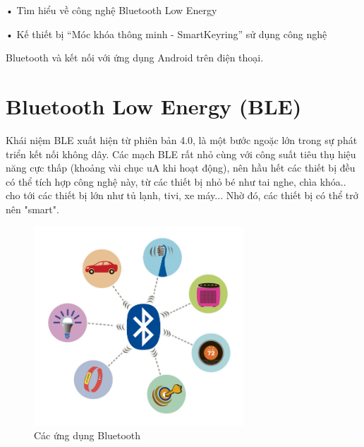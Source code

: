 • Tìm hiểu về công nghệ Bluetooth Low Energy

• Kế thiết bị “Móc khóa thông minh - SmartKeyring” sử dụng công nghệ

Bluetooth và kết nối với ứng dụng Android trên điện thoại.

\nomenclature[g-p]{$\pi$}{ $\simeq 3.14\ldots$}                                             %


\section{Bluetooth Low Energy (BLE) }  %
\label{section1.3} 
Khái niệm BLE xuất hiện từ phiên bản 4.0, là một bước ngoặc lớn trong sự phát triển kết nối không dây. Các mạch BLE rất nhỏ cùng với công suất tiêu thụ hiệu năng cực thấp (khoảng vài chục uA khi hoạt động), nên hầu hết các thiết bị đều có thể tích hợp công nghệ này, từ các thiết bị nhỏ bé như tai nghe, chìa khóa.. cho tới các thiết bị lớn như tủ lạnh, tivi, xe máy... Nhờ đó, các thiết bị có thể trở nên "smart".\cite{hte}
\begin{figure}[H]
	\centering    
	\includegraphics[width=0.7\textwidth]{btuse}
	\caption[Các ứng dụng Bluetooth]{Các ứng dụng Bluetooth}
	\label{fig:btuse}
\end{figure}
